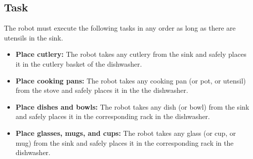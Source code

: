 \subsection{Task}
The robot must execute the following tasks in any order as long as there are utensils in the sink.
\begin{itemize}
	\item \textbf{Place cutlery:} The robot takes any cutlery from the sink and safely places it in the cutlery basket of the dishwasher.
	\item \textbf{Place cooking pans:} The robot takes any cooking pan (or pot, or utensil) from the stove and safely places it in the the dishwasher.
	\item \textbf{Place dishes and bowls:} The robot takes any dish (or bowl) from the sink and safely places it in the corresponding rack in the dishwasher.
	\item \textbf{Place glasses, mugs, and cups:} The robot takes any glass (or cup, or mug) from the sink and safely places it in the corresponding rack in the dishwasher.
\end{itemize}


